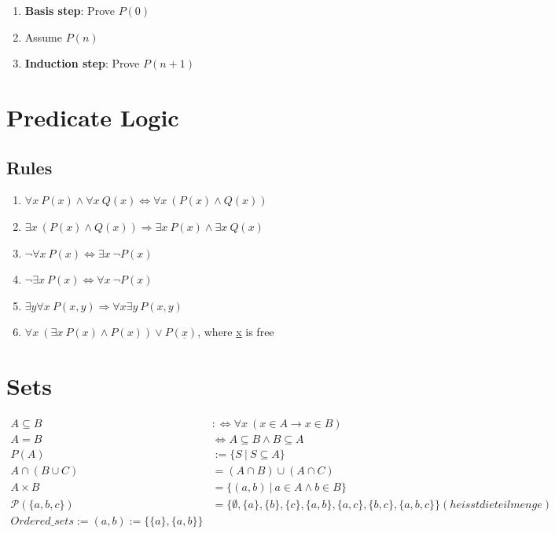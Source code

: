 \documentclass[11pt]{article}
\begin{document}
\begin{enumerate}
	\item \textbf{Basis step}: Prove $P(0)$
	\item Assume $P(n)$
	\item \textbf{Induction step}: Prove $P(n + 1)$
\end{enumerate}

\section{Predicate Logic}

\subsection{Rules}

\begin{enumerate}[labelindent=16pt,style=multiline,leftmargin=1.5cm, noitemsep]
	\item $\forall x\ P(x) \land \forall x\ Q(x) \Leftrightarrow \forall x\ (P(x) \land Q(x))$
	\item $\exists x\ (P(x) \land Q(x)) \Rightarrow \exists x\ P(x) \land \exists x\ Q(x)$
	\item $\neg\forall x\ P(x) \Leftrightarrow \exists x\ \neg P(x)$
	\item $\neg\exists x\ P(x) \Leftrightarrow \forall x \ \neg P(x)$
	\item $\exists y \forall x\ P(x, y) \Rightarrow \forall x \exists y\ P(x, y)$
	\item $\forall x\ (\exists x\ P(x) \land P(x)) \lor P(\underline{x})$, where \underline{x} is free
\end{enumerate}

\section{Sets}

\begin{equation*}
\begin{split}
	A \subseteq B & :\Leftrightarrow \forall x\ (x \in A \rightarrow x \in B) \\
	A = B & \Leftrightarrow A \subseteq B \land B \subseteq A \\
	P(A) & := \{S\ |\ S \subseteq A\} \\
	A \cap (B \cup C) & = (A \cap B) \cup (A \cap C) \\
	A \times B & = \{(a, b)\ |\ a \in A \land b \in B\} \\
	\mathcal{P}(\{a,b,c\}) & = \{\emptyset, \{a\}, \{b\}, \{c\}, \{a,b\}, \{a,c\}, \{b,c\}, \{a,b,c\}\} ( heisst die teilmenge) \\
	 Ordered\_sets:= (a,b):=\{\{a\},\{a,b\}\}
\end{split}
\end{equation*}
\end{document}
